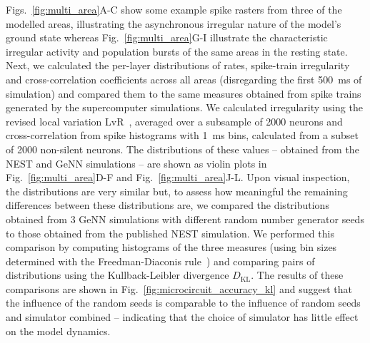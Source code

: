 \documentclass[9pt,a4paper]{amsart}
\begin{document}
Figs.~\ref{fig:multi_area}A-C show some example spike rasters from three of the modelled areas, illustrating the asynchronous irregular nature of the model's ground state whereas Fig.~\ref{fig:multi_area}G-I illustrate the characteristic irregular activity and population bursts of the same areas in the resting state.
Next, we calculated the per-layer distributions of rates, spike-train irregularity and cross-correlation coefficients across all areas (disregarding the first \SI{500}{\milli\second} of simulation) and compared them to the same measures obtained from spike trains generated by the supercomputer simulations.
We calculated irregularity using the revised local variation LvR~\citep{Shinomoto2009}, averaged over a subsample of \num{2000} neurons and cross-correlation from spike histograms with \SI{1}{\milli\second} bins, calculated from a subset of \num{2000} non-silent neurons.
The distributions of these values -- obtained from the NEST and GeNN simulations -- are shown as violin plots in Fig.~\ref{fig:multi_area}D-F and Fig.~\ref{fig:multi_area}J-L.
Upon visual inspection, the distributions are very similar but, to assess how meaningful the remaining differences between these distributions are, we compared the distributions obtained from 3 GeNN simulations with different random number generator seeds to those obtained from the published NEST simulation.
We performed this comparison by computing histograms of the three measures (using bin sizes determined with the Freedman-Diaconis rule~\citep{Freedman1981}) and comparing pairs of distributions using the Kullback-Leibler divergence $D_\text{KL}$.
The results of these comparisons are shown in Fig.~\ref{fig:microcircuit_accuracy_kl} and suggest that the influence of the random seeds is comparable to the influence of random seeds and simulator combined -- indicating that the choice of simulator has little effect on the model dynamics.
%
\end{document}
